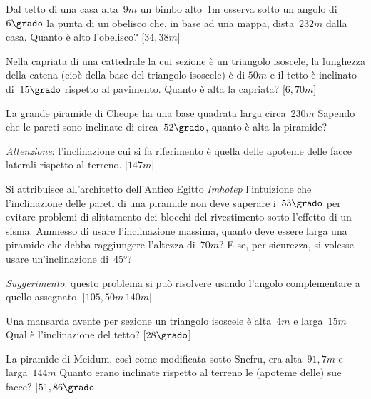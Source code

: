 \begin{multicols}{2}
\begin{esercizio}[\Ast]
\label{ese:G.56}
Dal tetto di una casa alta~$9\unit{m}$ un bimbo alto~1m osserva sotto un angolo 
di~$6\grado$ la punta di un obelisco che,
in base ad una mappa, dista~$232\unit{m}$ dalla casa. Quanto è alto l'obelisco?
\hfill [$34,38\unit{m}$]
\end{esercizio}

\begin{esercizio}[\Ast]
\label{ese:G.57}
Nella capriata di una cattedrale la cui sezione è un triangolo isoscele, la 
lunghezza della catena (cioè della base del triangolo isoscele) è di
$50\unit{m}$ e il tetto è inclinato di~$15\grado$ rispetto al pavimento. Quanto 
è alta la capriata?
\hfill [$6,70\unit{m}$]
\end{esercizio}

\begin{esercizio}[\Ast]
\label{ese:G.58}
La grande piramide di Cheope ha una base quadrata larga circa~$230\unit{m}$ 
Sapendo che le pareti sono inclinate di circa~$52\grado$,
quanto è alta la piramide?

\emph{Attenzione}: l'inclinazione cui si fa riferimento è quella delle apoteme 
delle facce laterali rispetto al terreno.
\hfill [$147\unit{m}$]
\end{esercizio}

\begin{esercizio}[\Ast]
\label{ese:G.59}
Si attribuisce all'architetto dell'Antico Egitto \emph{Imhotep} l'intuizione che 
l'inclinazione delle pareti di una piramide non deve superare
i~$53\grado$ per evitare problemi di slittamento dei blocchi del rivestimento 
sotto l'effetto di un sisma. Ammesso di usare
l'inclinazione massima, quanto deve essere larga una piramide che debba 
raggiungere l'altezza di~$70\unit{m}$?
E se, per sicurezza, si volesse usare un'inclinazione di~45°?

\emph{Suggerimento}: questo problema si può risolvere usando l'angolo 
complementare a quello assegnato.
\hfill [$105,50\unit{m}$\,$140\unit{m}$]
\end{esercizio}

\begin{esercizio}[\Ast]
\label{ese:G.60}
Una mansarda avente per sezione un triangolo isoscele è alta~$4\unit{m}$ e 
larga~$15\unit{m}$ Qual è l'inclinazione del tetto?
\hfill [$28\grado$]
\end{esercizio}

\begin{esercizio}[\Ast]
\label{ese:G.61}
La piramide di Meidum, così come modificata sotto Snefru, era 
alta~$91,7\unit{m}$ e larga~$144\unit{m}$
Quanto erano inclinate rispetto al terreno le (apoteme delle) sue facce?
\hfill [$51,86\grado$]
\end{esercizio}


\end{multicols}
